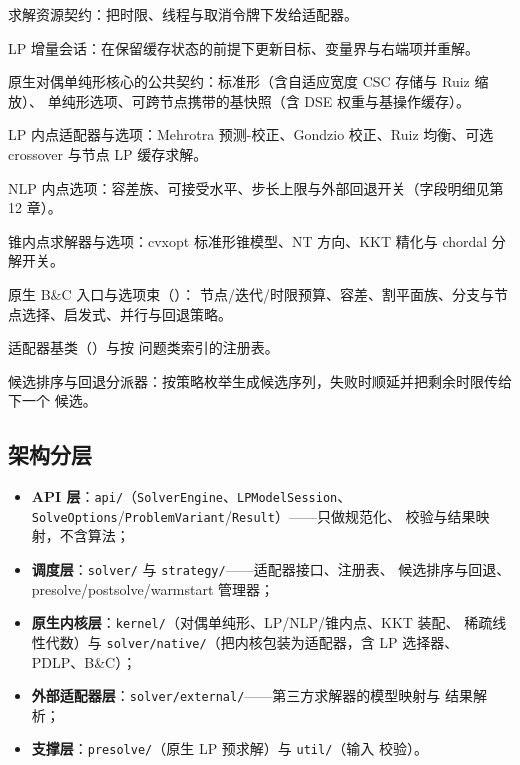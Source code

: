 \documentclass{ctexart}
\begin{document}
求解资源契约：把时限、线程与取消令牌下发给适配器。

LP 增量会话：在保留缓存状态的前提下更新目标、变量界与右端项并重解。

原生对偶单纯形核心的公共契约：标准形（含自适应宽度 CSC 存储与 Ruiz 缩放）、
单纯形选项、可跨节点携带的基快照（含 DSE 权重与基操作缓存）。

LP 内点适配器与选项：Mehrotra 预测-校正、Gondzio 校正、Ruiz 均衡、可选 crossover
与节点 LP 缓存求解。

NLP 内点选项：容差族、可接受水平、步长上限与外部回退开关（字段明细见第 12 章）。

锥内点求解器与选项：cvxopt 标准形锥模型、NT 方向、KKT 精化与 chordal 分解开关。

原生 B\&C 入口与选项束（）：
节点/迭代/时限预算、容差、割平面族、分支与节点选择、启发式、并行与回退策略。

适配器基类（）与按
问题类索引的注册表。

候选排序与回退分派器：按策略枚举生成候选序列，失败时顺延并把剩余时限传给下一个
候选。

\subsection{架构分层}

\begin{itemize}
  \item \textbf{API 层}：\texttt{api/}（\texttt{SolverEngine}、\texttt{LPModelSession}、
        \texttt{SolveOptions}/\texttt{ProblemVariant}/\texttt{Result}）——只做规范化、
        校验与结果映射，不含算法；
  \item \textbf{调度层}：\texttt{solver/} 与 \texttt{strategy/}——适配器接口、注册表、
        候选排序与回退、presolve/postsolve/warmstart 管理器；
  \item \textbf{原生内核层}：\texttt{kernel/}（对偶单纯形、LP/NLP/锥内点、KKT 装配、
        稀疏线性代数）与 \texttt{solver/native/}（把内核包装为适配器，含 LP 选择器、
        PDLP、B\&C）；
  \item \textbf{外部适配器层}：\texttt{solver/external/}——第三方求解器的模型映射与
        结果解析；
  \item \textbf{支撑层}：\texttt{presolve/}（原生 LP 预求解）与 \texttt{util/}（输入
        校验）。
\end{itemize}
\end{document}
